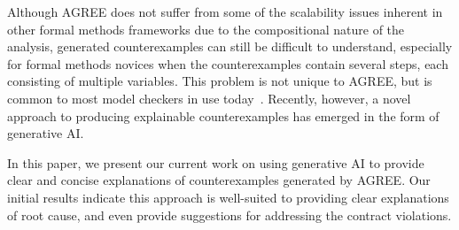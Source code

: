Although AGREE does not suffer from some of the scalability issues inherent in other formal methods frameworks due to the compositional nature of the analysis, generated counterexamples can still be difficult to understand, especially for formal methods novices when the counterexamples contain several steps, each consisting of multiple variables.  This problem is not unique to AGREE, but is common to most model checkers in use today~\cite{?}.  
Recently, however, a novel approach to producing explainable counterexamples has emerged in the form of generative AI.



In this paper, we present our current work on using generative AI to provide clear and concise explanations of counterexamples generated by AGREE.  Our initial results indicate this approach is well-suited to providing clear explanations of root cause, and even provide suggestions for addressing the contract violations.